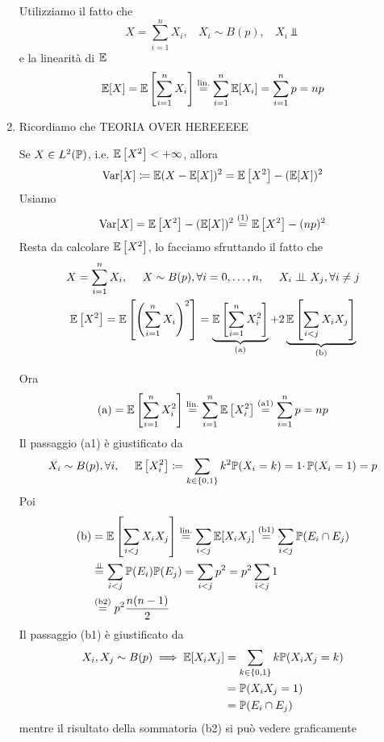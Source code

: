 \begin{enumerate}
Utilizziamo il fatto che
\begin{equation*}
X=\sum\limits_{i=1}^{n} X_{i} ,\ \ \ \ X_{i} \sim B(p) ,\ \ \ \ X_{i} \Bot 
\end{equation*}
e la linearità di $\mathbb{E}$
\begin{equation*}
\mathbb{E}[X] =\mathbb{E}\left[\sum\limits_{i=1}^{n} X_{i}\right]\overset{\text{lin.}}{=}\sum\limits_{i=1}^{n}\mathbb{E}[X_{i}] =\sum\limits_{i=1}^{n} p=np
\end{equation*}
\item Ricordiamo che TEORIA OVER HEREEEEE

Se $X\in L^{2}(\mathbb{P})$, i.e. $\mathbb{E}\left[X^{2}\right] < +\infty $, allora
\begin{equation*}
\mathrm{Var}[X] \coloneqq \mathbb{E}(X-\mathbb{E}[X])^{2} =\mathbb{E}\left[X^{2}\right] -(\mathbb{E}[X])^{2}
\end{equation*}
Usiamo
\begin{equation*}
\mathrm{Var}[X] =\mathbb{E}\left[X^{2}\right] -(\mathbb{E}[X])^{2}\overset{(1)}{=}\mathbb{E}\left[X^{2}\right] -(np)^{2}
\end{equation*}
Resta da calcolare $\mathbb{E}\left[X^{2}\right]$, lo facciamo sfruttando il fatto che
\begin{gather*}
X=\sum\limits_{i=1}^{n} X_{i} ,\ \ \ \ X\sim B(p) ,\forall i=0,\dots ,n,\ \ \ \ X_{i} \perp \!\!\! \perp X_{j} ,\forall i\neq j\\
\mathbb{E}\left[X^{2}\right] =\mathbb{E}\left[\left(\sum\limits_{i=1}^{n} X_{i}\right)^{2}\right] =\underbrace{\mathbb{E}\left[\sum\limits_{i=1}^{n} X_{i}^{2}\right]}_{\text{(a)}} +2\underbrace{\mathbb{E}\left[\sum\limits_{i< j} X_{i} X_{j}\right]}_{\text{(b)}}
\end{gather*}

Ora
\begin{equation*}
\text{(a)} =\mathbb{E}\left[\sum\limits_{i=1}^{n} X_{i}^{2}\right]\overset{\text{lin.}}{=}\sum\limits_{i=1}^{n}\mathbb{E}\left[X_{i}^{2}\right]\overset{\text{(a1)}}{=}\sum\limits_{i=1}^{n} p=np
\end{equation*}
Il passaggio (a1) è giustificato da
\begin{equation*}
X_{i} \sim B(p) ,\forall i,\ \ \ \ \EE\left[X_{i}^{2}\right] \coloneqq \sum\limits_{k\in \{0,1\}} k^{2}\PP(X_{i} =k) =1\cdotp \PP(X_{i} =1) =p
\end{equation*}
Poi
\begin{align*}
\text{(b)} & =\mathbb{E}\left[\sum\limits_{i< j} X_{i} X_{j}\right]\overset{\text{lin.}}{=}\sum\limits_{i< j} \mathbb{E}[X_{i} X_{j}]\overset{\text{(b1)}}{=}\sum\limits_{i< j}\mathbb{P}(E_{i} \cap E_{j})\\
 & \overset{\perp \!\!\! \perp }{=}\sum\limits_{i< j}\mathbb{P}(E_{i})\mathbb{P}(E_{j}) =\sum\limits_{i< j} p^{2} =p^{2}\sum\limits_{i< j} 1\\
 & \overset{\text{(b2)}}{=} p^{2}\frac{n(n-1)}{2}
\end{align*}
Il passaggio (b1) è giustificato da
\begin{align*}
X_{i} ,X_{j} \sim B(p) \implies \mathbb{E}[X_{i} X_{j}] & =\sum\limits_{k\in \{0,1\}} k\mathbb{P}(X_{i} X_{j} =k)\\
 & =\mathbb{P}(X_{i} X_{j} =1)\\
 & =\mathbb{P}(E_{i} \cap E_{j})
\end{align*}
mentre il risultato della sommatoria (b2) si può vedere graficamente


\end{enumerate}
